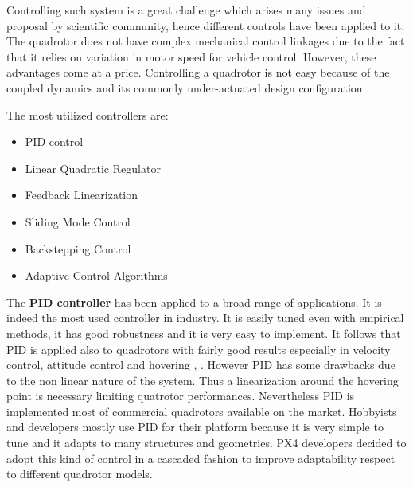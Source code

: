\noindent
Controlling such system is a great challenge which arises many issues and proposal by scientific community, hence different controls have been applied to it. The quadrotor does not have complex mechanical control linkages due to the fact that it relies on variation in motor speed for vehicle control. However, these advantages come at a price. Controlling a quadrotor is not easy because of the coupled dynamics and its commonly under-actuated design configuration \cite{Algorithms2014}.
\par The most utilized controllers are: \begin{itemize}
\item PID control
\item Linear Quadratic Regulator
\item Feedback Linearization
\item Sliding Mode Control
\item Backstepping Control
\item Adaptive Control Algorithms
\end{itemize}
The \textbf{PID controller} has been applied to a broad range of applications. It is indeed the most used controller in industry. It is easily tuned even with empirical methods, it has good robustness and it is very easy to implement. It follows that PID is applied also to quadrotors with fairly good results  especially in velocity control, attitude control and hovering \cite{Mahony2012}, \cite{Erginer2007}. However PID has some drawbacks due to the non linear nature of the system. Thus a linearization around the hovering point is necessary \cite{Bouabdallah2} limiting quatrotor performances. Nevertheless PID is implemented most of commercial quadrotors available on the market. Hobbyists and developers mostly use PID for their platform because it is very simple to tune and it adapts to many structures and geometries. PX4 developers decided to adopt this kind of control in a cascaded fashion to improve adaptability respect to different quadrotor models. \par
\noindent
